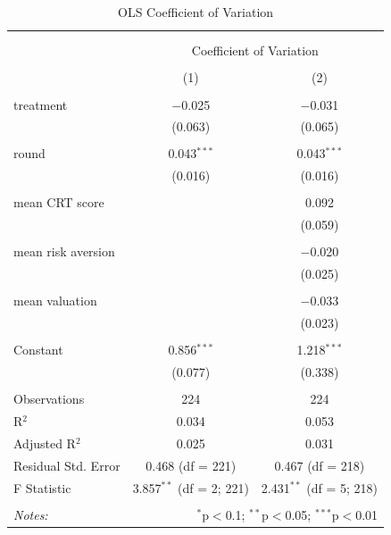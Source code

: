 \begin{table}[!htbp] \centering 
  \caption{OLS Coefficient of Variation} 
  \label{tab:var_coeff_ols} 
\begin{tabular}{@{\extracolsep{5pt}}lcc} 
\\[-1.8ex]\hline 
\hline \\[-1.8ex] 
\\[-1.8ex] & \multicolumn{2}{c}{Coefficient of Variation} \\ 
\\[-1.8ex] & (1) & (2)\\ 
\hline \\[-1.8ex] 
 treatment & $-$0.025 & $-$0.031 \\ 
  & (0.063) & (0.065) \\ 
  & & \\ 
 round & 0.043$^{***}$ & 0.043$^{***}$ \\ 
  & (0.016) & (0.016) \\ 
  & & \\ 
 mean CRT score &  & 0.092 \\ 
  &  & (0.059) \\ 
  & & \\ 
 mean risk aversion &  & $-$0.020 \\ 
  &  & (0.025) \\ 
  & & \\ 
 mean valuation &  & $-$0.033 \\ 
  &  & (0.023) \\ 
  & & \\ 
 Constant & 0.856$^{***}$ & 1.218$^{***}$ \\ 
  & (0.077) & (0.338) \\ 
  & & \\
  \hline
Observations & 224 & 224 \\ 
R$^{2}$ & 0.034 & 0.053 \\ 
Adjusted R$^{2}$ & 0.025 & 0.031 \\ 
Residual Std. Error & 0.468 (df = 221) & 0.467 (df = 218) \\ 
F Statistic & 3.857$^{**}$ (df = 2; 221) & 2.431$^{**}$ (df = 5; 218) \\ 
\hline
\hline \\[-1.8ex] 
\textit{Notes:} & \multicolumn{2}{r}{$^{*}$p$<$0.1; $^{**}$p$<$0.05; $^{***}$p$<$0.01} \\ 
\end{tabular} 
\end{table}


